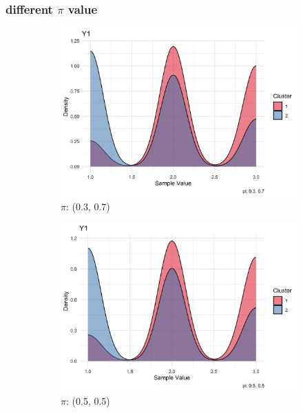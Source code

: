 \documentclass{article}
\begin{document}
\subsubsection*{different $\pi$ value}
\begin{figure}[h]
  \centering
  \begin{subfigure}{0.3\textwidth}
      \centering
      \includegraphics[width=\textwidth]{images/pi_03_07.png}
      \caption{$\pi$: (0.3, 0.7)}
  \end{subfigure}
  \hfill
  \begin{subfigure}{0.3\textwidth}
      \centering
      \includegraphics[width=\textwidth]{images/pi_05_05.png}
      \caption{$\pi$: (0.5, 0.5)}
  \end{subfigure}
  \hfill
  \begin{subfigure}{0.3\textwidth}

\end{subfigure}
\end{figure}
\end{document}
